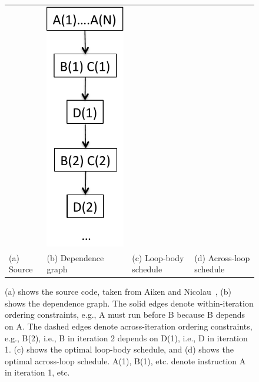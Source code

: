 \documentclass[sigconf, screen, natbib=false, dvipsnames, table]{acmart}
\theoremstyle{definition}
\begin{document}
\begin{figure}[tbhp]
\begin{tabular}{llll}
&

\begin{minipage}[b]{4.25cm}
\includegraphics[height=0.20\textheight]{figs/MPCaccrossLoop.pdf}
\end{minipage}
\\


(a) Source 
&
(b) Dependence graph
&
(c) Loop-body schedule
&
(d) Across-loop schedule

\end{tabular}
\caption{(a) shows the source code, taken from Aiken and Nicolau~\cite{Aiken:1988}, 
(b) shows the dependence graph. The solid edges denote within-iteration ordering constraints, e.g., A must run before B
because B depends on A. The dashed edges denote across-iteration ordering constraints, e.g., B(2), i.e., B in iteration 2
depends on D(1), i.e., D in iteration 1. (c) shows the optimal loop-body schedule, and (d) shows the
optimal across-loop schedule. A(1), B(1), etc. denote instruction A in iteration 1, etc.}
\label{fig:MPCexample}\vspace{-2ex}
\end{figure}
\end{document}
